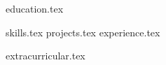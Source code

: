 \documentclass[letterpaper,11pt]{article}
\begin{document}


{education.tex}


\sidebyside
    {{skills.tex}}
    {{projects.tex}}
{experience.tex}

{extracurricular.tex}
\end{document}
